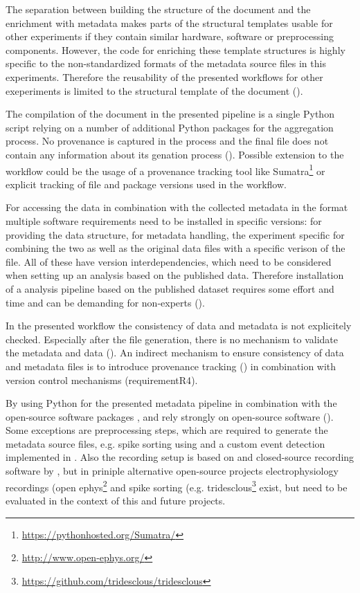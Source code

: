 The separation between building the structure of the  document and the enrichment with metadata makes parts of the structural templates usable for other experiments if they contain similar hardware, software or preprocessing components. However, the code for enriching these template structures is highly specific to the non-standardized formats of the metadata source files in this experiments. Therefore the reusability of the presented workflows for other exeperiments is limited to the structural template of the  document ().

The compilation of the  document in the presented pipeline is a single Python script relying on a number of additional Python packages for the aggregation process. No provenance is captured in the process and the final  file does not contain any information about its genation process (). Possible extension to the workflow could be the usage of a provenance tracking tool like Sumatra\footnote{\url{https://pythonhosted.org/Sumatra/}} or explicit tracking of file and package versions used in the workflow.

For accessing the data in combination with the collected metadata in the  format multiple software requirements need to be installed in specific versions:  for providing the data structure,  for metadata handling, the experiment specific  for combining the two as well as the original data files with a specific verison of the  file. All of these have version interdependencies, which need to be considered when setting up an analysis based on the published data. Therefore installation of a analysis pipeline based on the published dataset requires some effort and time and can be demanding for non-experts ().

In the presented workflow the consistency of data and metadata is not explicitely checked. Especially after the  file generation, there is no mechanism to validate the metadata and data (). An indirect mechanism to ensure consistency of data and metadata files is to introduce provenance tracking () in combination with version control mechanisms (requirement{R4}).

By using Python for the presented metadata pipeline in combination with the open-source software packages ,  and  \citet{Brochier_2018} rely strongly on open-source software (). Some exceptions are preprocessing steps, which are required to generate the metadata source files, e.g. spike sorting using  and a custom event detection implemented in . Also the recording setup is based on  and closed-source recording software by , but in priniple alternative open-source projects electrophysiology recordings (open ephys\footnote{\url{http://www.open-ephys.org/}} and spike sorting (e.g. tridesclous\footnote{\url{https://github.com/tridesclous/tridesclous}} exist, but need to be evaluated in the context of this and future projects.


